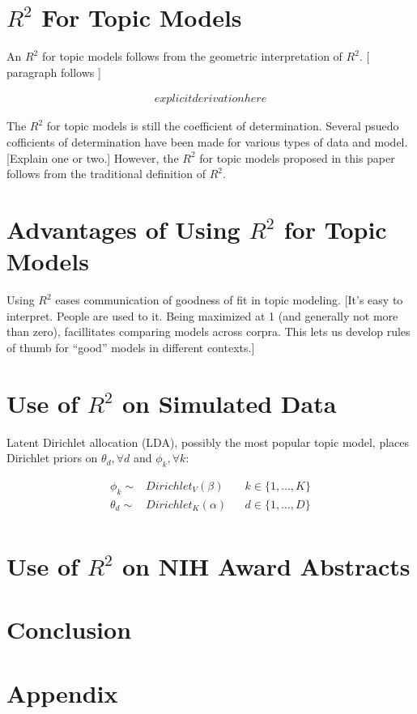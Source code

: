 \documentclass[12pt]{amsart}
\begin{document}



\section{$R^2$ For Topic Models}

An $R^2$ for topic models follows from the geometric interpretation of $R^2$. [ paragraph follows ]

\begin{align*}
	explicit derivation here
\end{align*}

The $R^2$ for topic models is still the coefficient of determination. Several psuedo cofficients of determination have been made for various types of data and model. [Explain one or two.] However, the $R^2$ for topic models proposed in this paper follows from the traditional definition of $R^2$. 

\section{Advantages of Using $R^2$ for Topic Models}

Using $R^2$ eases communication of goodness of fit in topic modeling. [It's easy to interpret. People are used to it. Being maximized at 1 (and generally not more than zero), facillitates comparing models across corpra. This lets us develop rules of thumb for ``good'' models in different contexts.]


\section{Use of $R^2$ on Simulated Data}

Latent Dirichlet allocation (LDA), possibly the most popular topic model, places Dirichlet priors on $\theta_d, \forall d$ and $\phi_k, \forall k$:
 
\begin{align*}
\phi_k \sim& Dirichlet_V(\beta) && k\in\{1, \ldots, K\} \\
{\theta}_d \sim& Dirichlet_K({\alpha}) && d\in\{1, \ldots, D\}\\
\end{align*}

\section{Use of $R^2$ on NIH Award Abstracts}


\section{Conclusion}




\section{Appendix}

\newpage
\begin{thebibliography}{9}

 

\end{thebibliography}
\end{document}
